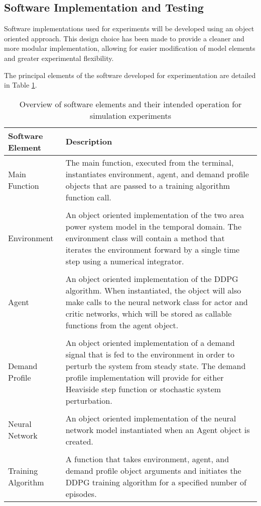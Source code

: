 \subsection{Software Implementation and Testing}\label{sec:software}
Software implementations used for experiments will be developed using an object oriented approach. This design choice has been made to provide a cleaner and more modular implementation, allowing for easier modification of model elements and greater experimental flexibility.

The principal elements of the software developed for experimentation are detailed in Table \ref{tab:software_elements}.
\begin{table}[h]
	\centering
	\caption[Software elements and their intended use]{Overview of software elements and their intended operation for simulation experiments}
	\begin{tabular}{lp{10cm}}
		\toprule
		\textbf{Software Element} & \textbf{Description} \\
		\midrule
		Main Function & The main function, executed from the terminal, instantiates environment, agent, and demand profile objects that are passed to a training algorithm function call.\\
		 & \\
		Environment & An object oriented implementation of the two area power system model in the temporal domain. The environment class will contain a method that iterates the environment forward by a single time step using a numerical integrator.\\
		 & \\
		Agent & An object oriented implementation of the DDPG algorithm. When instantiated, the object will also make calls to the neural network class for actor and critic networks, which will be stored as callable functions from the agent object. \\
		 & \\
		Demand Profile & An object oriented implementation of a demand signal that is fed to the environment in order to perturb the system from steady state. The demand profile implementation will provide for either Heaviside step function or stochastic system perturbation.\\
		 & \\
		Neural Network & An object oriented implementation of the neural network model instantiated when an Agent object is created.\\
		 & \\
		Training Algorithm & A function that takes environment, agent, and demand profile object arguments and initiates the DDPG training algorithm for a specified number of episodes.\\
		\bottomrule
	\end{tabular}
	\label{tab:software_elements}
\end{table}

